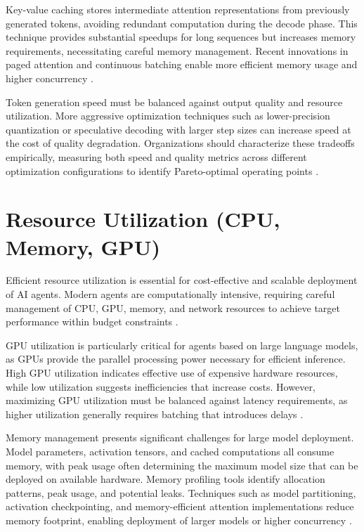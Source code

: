 \begin{TNtwocol}
Key-value caching stores intermediate attention representations from previously generated tokens, avoiding redundant computation during the decode phase. This technique provides substantial speedups for long sequences but increases memory requirements, necessitating careful memory management. Recent innovations in paged attention and continuous batching enable more efficient memory usage and higher concurrency \cite{pope2023,pope2023}.

Token generation speed must be balanced against output quality and resource utilization. More aggressive optimization techniques such as lower-precision quantization or speculative decoding with larger step sizes can increase speed at the cost of quality degradation. Organizations should characterize these tradeoffs empirically, measuring both speed and quality metrics across different optimization configurations to identify Pareto-optimal operating points \cite{pope2023,getmaximai2024}.

\section{Resource Utilization (CPU, Memory, GPU)}
Efficient resource utilization is essential for cost-effective and scalable deployment of AI agents. Modern agents are computationally intensive, requiring careful management of CPU, GPU, memory, and network resources to achieve target performance within budget constraints \cite{huggingface2024,getmaximai2024}.

GPU utilization is particularly critical for agents based on large language models, as GPUs provide the parallel processing power necessary for efficient inference. High GPU utilization indicates effective use of expensive hardware resources, while low utilization suggests inefficiencies that increase costs. However, maximizing GPU utilization must be balanced against latency requirements, as higher utilization generally requires batching that introduces delays \cite{huggingface2024,getmaximai2024}.

Memory management presents significant challenges for large model deployment. Model parameters, activation tensors, and cached computations all consume memory, with peak usage often determining the maximum model size that can be deployed on available hardware. Memory profiling tools identify allocation patterns, peak usage, and potential leaks. Techniques such as model partitioning, activation checkpointing, and memory-efficient attention implementations reduce memory footprint, enabling deployment of larger models or higher concurrency \cite{huggingface2024}.


\end{TNtwocol}
